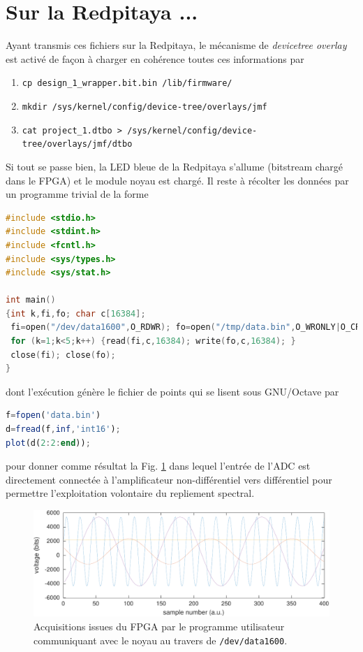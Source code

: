 \documentclass[12pt,oneside]{article}
\begin{document}
\section{Sur la Redpitaya ...}

Ayant transmis ces fichiers sur la Redpitaya, le m\'ecanisme de {\em devicetree overlay}
est activ\'e de fa\c con \`a charger en coh\'erence toutes ces informations par
\begin{enumerate}
\item {\tt cp design\_1\_wrapper.bit.bin /lib/firmware/}
\item {\tt mkdir /sys/kernel/config/device-tree/overlays/jmf}
\item {\tt cat project\_1.dtbo > /sys/kernel/config/device-tree/overlays/jmf/dtbo}
\end{enumerate}

Si tout se passe bien, la LED bleue de la Redpitaya s'allume (bitstream charg\'e dans le FPGA)
et le module noyau est charg\'e. Il reste \`a r\'ecolter les donn\'ees par un programme trivial
de la forme

\begin{lstlisting}[language=C]
#include <stdio.h>
#include <stdint.h>
#include <fcntl.h>
#include <sys/types.h>
#include <sys/stat.h>

int main()
{int k,fi,fo; char c[16384];
 fi=open("/dev/data1600",O_RDWR); fo=open("/tmp/data.bin",O_WRONLY|O_CREAT);
 for (k=1;k<5;k++) {read(fi,c,16384); write(fo,c,16384); }
 close(fi); close(fo);
}
\end{lstlisting}

dont l'ex\'ecution g\'en\`ere le fichier de points qui se lisent sous GNU/Octave par
\begin{lstlisting}[language=Octave]
f=fopen('data.bin')
d=fread(f,inf,'int16');
plot(d(2:2:end));
\end{lstlisting}

pour donner comme r\'esultat la Fig. \ref{adc} dans lequel l'entr\'ee de l'ADC est
directement connect\'ee \`a l'amplificateur non-diff\'erentiel vers diff\'erentiel
pour permettre l'exploitation volontaire du repliement spectral.

\begin{figure}[h!tb]
\includegraphics[width=\linewidth]{mesures}
\caption{Acquisitions issues du FPGA par le programme utilisateur communiquant avec
le noyau au travers de {\tt /dev/data1600}.}
\label{adc}
\end{figure}
\end{document}

